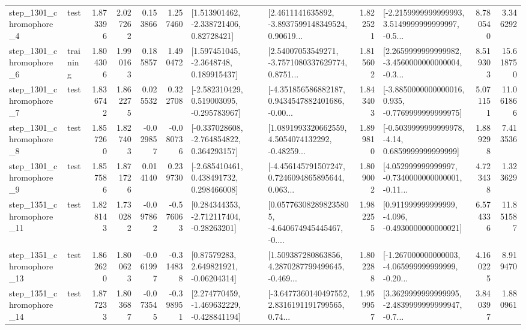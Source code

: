 \begin{tabular}{llrrrrllrlrr}
  step\_1301\_chromophore\_4 &      test &      1.873396 &    2.027262 &      0.153866 &  1.257460 &     [1.513901462, -2.338721406, 0.82728421] &  [2.4611141635892, -3.8937599148349524, 0.90619... &       1.822521 &  [-2.2159999999999993, 3.5149999999999997, -0.5... &            8.780540 &          3.346292 \\
  step\_1301\_chromophore\_6 &  training &      1.804306 &    1.990163 &      0.185857 &  1.490472 &      [1.597451045, -2.3648748, 0.189915437] &  [2.54007053549271, -3.7571080337629774, 0.8751... &       1.815602 &  [2.2659999999999982, -3.4560000000000004, -0.3... &            8.519303 &         15.618750 \\
  step\_1301\_chromophore\_7 &      test &      1.836742 &    1.862275 &      0.025532 &  0.322708 &   [-2.582310429, 0.519003095, -0.295783967] &  [-4.351856586882187, 0.9434547882401686, -0.00... &       1.843403 &  [-3.8850000000000016, 0.935, -0.7769999999999975] &            5.071151 &         11.061866 \\
  step\_1301\_chromophore\_8 &      test &      1.857260 &    1.827403 &     -0.029857 & -0.080736 &   [-0.337028608, -2.764854822, 0.364293157] &  [1.0891993320662559, 4.5054074132292, -0.48259... &       1.899810 &   [-0.5039999999999978, -4.14, 0.6859999999999999] &            1.889298 &          7.413536 \\
  step\_1301\_chromophore\_9 &      test &      1.857586 &    1.871726 &      0.014140 &  0.239730 &    [-2.685410461, 0.438491732, 0.298466008] &  [-4.456145791507247, 0.7246094865895644, 0.063... &       1.809002 &  [4.052999999999997, -0.7340000000000001, -0.11... &            4.723438 &          1.323629 \\
 step\_1351\_chromophore\_11 &      test &      1.828143 &    1.730282 &     -0.097862 & -0.576063 &    [0.284344353, -2.712117404, -0.28263201] &  [0.057763082898235805, -4.640674945445467, -0.... &       1.982255 &   [0.911999999999999, -4.096, -0.4930000000000021] &            6.574336 &         11.851587 \\
 step\_1351\_chromophore\_13 &      test &      1.862620 &    1.800623 &     -0.061997 & -0.314838 &      [0.87579283, 2.649821921, -0.06204314] &  [1.509387280863856, 4.2870287799499645, -0.469... &       1.802288 &  [-1.267000000000003, -4.065999999999999, -0.20... &            4.160225 &          8.919470 \\
 step\_1351\_chromophore\_14 &      test &      1.877233 &    1.803687 &     -0.073545 & -0.398951 &   [2.274770459, -1.469632229, -0.428841194] &  [-3.6477360140497552, 2.8316191191799565, 0.74... &       1.959957 &  [3.3629999999999995, -2.4839999999999947, -0.7... &            3.840397 &          1.880961 \\

\end{tabular}
